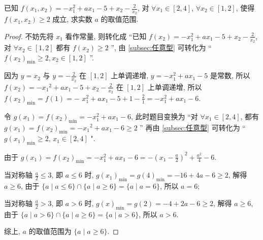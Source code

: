 \begin{variation}\label{variation:2.1.4}
  已知 \(f(x_1, x_2)  =  -{x}_{1}^{2} + a{x}_{1} -5 + {x}_{2} -\frac{2}{{x}_{2}}\), 对 \(\forall {x}_{1} \in  \left\lbrack  {2, 4}\right\rbrack\), \(\forall {x}_{2} \in  \left\lbrack  {1, 2}\right\rbrack\), 使得 \(f(x_1, x_2)  \geq  2\) 成立, 求实数 \(a\) 的取值范围.
\end{variation}

\begin{proof}
  不妨先将 \({x}_{1}\) 看作常量, 则转化成 “已知 \(f\left( {x}_{2}\right)  =  -{x}_{1}^{2} + a{x}_{1} -5 + {x}_{2} -\frac{2}{{x}_{2}}\), 对 \(\forall {x}_{2} \in  \left\lbrack  {1, 2}\right\rbrack\) 都有 \(f\left( {x}_{2}\right)  \geq  2\) ”, 由 \ref{subsec:任意型} 可转化为 “ \(f{\left( {x}_{2}\right) }_{\min } \geq  2, {x}_{2} \in  \left\lbrack  {1, 2}\right\rbrack\) ”.

因为 \(y = {x}_{2}\) 与 \(y =  -\frac{2}{{x}_{2}}\) 在 \(\left\lbrack  {1, 2}\right\rbrack\) 上单调递增, \(y =  -{x}_{1}^{2} + a{x}_{1} -5\) 是常数, 所以 \(f\left( {x}_{2}\right)  =  -{x}_{1}{}^{2} + a{x}_{1} -5 + {x}_{2} -\frac{2}{{x}_{2}}\) 在 \(\left\lbrack  {1, 2}\right\rbrack\) 上单调递增, 所以 \(f{\left( {x}_{2}\right) }_{\min } = f\left( 1\right)  =  -\)  \({x}_{1}^{2} + a{x}_{1} -5 + 1 -\frac{2}{1} =  -{x}_{1}^{2} + a{x}_{1} -6.\)

令 \(g\left( {x}_{1}\right)  = f{\left( {x}_{2}\right) }_{\min } =  -{x}_{1}^{2} + a{x}_{1} -6\), 此时题目变换为 “对 \(\forall {x}_{1} \in  \left\lbrack  {2, 4}\right\rbrack\), 都有 \(g\left( {x}_{1}\right)  = f{\left( {x}_{2}\right) }_{\min } =  -{x}_{1}{}^{2} + a{x}_{1} -6 \geq  2\) ” 再由 \ref{subsec:任意型} 可转化为 “ \(g{\left( {x}_{1}\right) }_{\min } \geq  2\), \({x}_{1} \in  \left\lbrack  {2, 4}\right\rbrack\) ".

由于 \(g\left( {x}_{1}\right)  = f{\left( {x}_{2}\right) }_{\min } =  -{x}_{1}^{2} + a{x}_{1} -6 =  -{\left( {x}_{1} -\frac{a}{2}\right) }^{2} + \frac{{a}^{2}}{4} -6\).

当对称轴 \(\frac{a}{2} \leq  3\), 即 \(a \leq  6\) 时, \(g{\left( {x}_{1}\right) }_{\min } = g{\left( 4\right) }_{\min } =  -{16} + {4a} -6 \geq  2\), 解得 \(a \geq  6\), 由于 \(\{ a \mid  a \leq  6\}  \cap  \{ a \mid  a \geq  6\}  = \{ a \mid  a = 6\}\), 所以 \(a = 6\);

当对称轴 \(\frac{a}{2} > 3\), 即 \(a > 6\) 时, \(g{(x) }_{\min } = g\left( 2\right)  =  -4 + {2a} -6 \geq  2\), 解得 \(a \geq  6\), 由于 \(\{ a \mid  a > 6\}  \cap  \{ a \mid  a \geq  6\}  = \{ a \mid  a > 6\}\), 所以 \(a > 6\).

综上, \(a\) 的取值范围为 \(\{ a \mid  a \geq  6\}\).
\end{proof}




